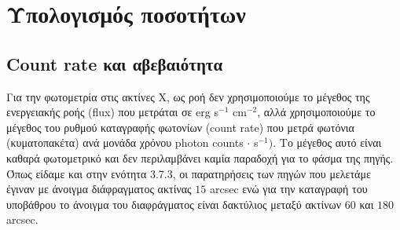 
\section{Υπολογισμός ποσοτήτων}


\subsection{\textlatin{Count rate} και αβεβαιότητα}

Για την φωτομετρία στις ακτίνες Χ, ως ροή δεν χρησιμοποιούμε το μέγεθος της ενεργειακής ροής (\textlatin{flux}) που μετράται σε \textlatin{erg s}$^{-1}$ \textlatin{cm}$^{-2}$, αλλά χρησιμοποιούμε το μέγεθος του ρυθμού καταγραφής φωτονίων (\textlatin{count rate}) που μετρά φωτόνια (κυματοπακέτα) ανά μονάδα χρόνου \textlatin{photon counts} $\cdot$ \textlatin{s}$^{-1})$. Το μέγεθος αυτό είναι καθαρά φωτομετρικό και δεν περιλαμβάνει καμία παραδοχή για το φάσμα της πηγής.\\
Όπως είδαμε και στην ενότητα 3.7.3, οι παρατηρήσεις των πηγών που μελετάμε έγιναν με άνοιγμα διάφραγματος ακτίνας $15$ \textlatin{arcsec} ενώ για την καταγραφή του υποβάθρου το άνοιγμα του διαφράγματος είναι δακτύλιος μεταξύ ακτίνων $60$ και $180$ \textlatin{arcsec}.

